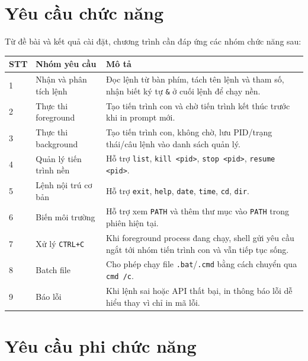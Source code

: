 \documentclass[13pt,a4paper,oneside]{extreport}
\begin{document}
\section{Yêu cầu chức năng}

Từ đề bài và kết quả cài đặt, chương trình cần đáp ứng các nhóm chức năng sau:

\begin{longtable}{|p{1.2cm}|p{5cm}|p{8cm}|}
	\hline
	\textbf{STT} & \textbf{Nhóm yêu cầu}  & \textbf{Mô tả}                                                                                       \\
	\hline
	1            & Nhận và phân tích lệnh & Đọc lệnh từ bàn phím, tách tên lệnh và tham số, nhận biết ký tự \texttt{\&} ở cuối lệnh để chạy nền. \\
	\hline
	2            & Thực thi foreground    & Tạo tiến trình con và chờ tiến trình kết thúc trước khi in prompt mới.                               \\
	\hline
	3            & Thực thi background    & Tạo tiến trình con, không chờ, lưu PID/trạng thái/câu lệnh vào danh sách quản lý.                    \\
	\hline
	4            & Quản lý tiến trình nền & Hỗ trợ \texttt{list}, \texttt{kill <pid>}, \texttt{stop <pid>}, \texttt{resume <pid>}.               \\
	\hline
	5            & Lệnh nội trú cơ bản    & Hỗ trợ \texttt{exit}, \texttt{help}, \texttt{date}, \texttt{time}, \texttt{cd}, \texttt{dir}.        \\
	\hline
	6            & Biến môi trường        & Hỗ trợ xem \texttt{PATH} và thêm thư mục vào \texttt{PATH} trong phiên hiện tại.                     \\
	\hline
	7            & Xử lý \texttt{CTRL+C}  & Khi foreground process đang chạy, shell gửi yêu cầu ngắt tới nhóm tiến trình con và vẫn tiếp tục sống. \\
	\hline
	8            & Batch file             & Cho phép chạy file \texttt{.bat}/\texttt{.cmd} bằng cách chuyển qua \texttt{cmd /c}.                 \\
	\hline
	9            & Báo lỗi                & Khi lệnh sai hoặc API thất bại, in thông báo lỗi dễ hiểu thay vì chỉ in mã lỗi.                      \\
	\hline
\end{longtable}

\section{Yêu cầu phi chức năng}
\end{document}
